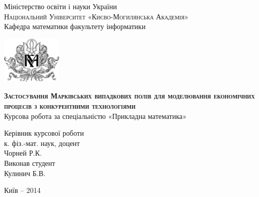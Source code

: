 \begin{titlepage}
\newpage

\begin{center}
Міністерство освіти і науки України \\
\textsc{Національний Університет «Києво-Могилянська Академія»} \\
Кафедра математики факультету інформатики
\end{center}

\vspace{2em}

\centering
\includegraphics[height=6em]{logo}

\vspace{1em}

\begin{center}
\textsc{\textbf{Застосування Марківських випадкових полів для моделювання економічних процесів з конкурентними технологіями}} \\
Курсова робота за спеціальністю «Прикладна математика»
\end{center}

\vspace{6em}

\begin{flushright}
Керівник курсової роботи \\
к. фіз.-мат. наук, доцент \\
Чорней Р.К. \\
\vspace{2em}
Виконав студент \\
Кулинич Б.В. \\
\end{flushright}

\vspace{\fill}

\begin{center}
Київ – 2014
\end{center}

\end{titlepage}